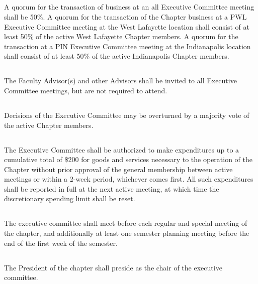 \documentclass[10pt, oneside]{article}
\begin{document}
\subsection{}
A quorum for the transaction of business at an all Executive Committee meeting shall be 50\%. A quorum for the transaction of the Chapter business at a PWL Executive Committee meeting at the West Lafayette location shall consist of at least 50\% of the active West Lafayette Chapter members. A quorum for the transaction at a PIN Executive Committee meeting at the Indianapolis location shall consist of at least 50\% of the active Indianapolis Chapter members. 

\subsection{}
The Faculty Advisor(s) and other Advisors shall be invited to all Executive Committee meetings, but are not required to attend.

\subsection{}
Decisions of the Executive Committee may be overturned by a majority vote of the active Chapter members.

\subsection{}
The Executive Committee shall be authorized to make expenditures up to a cumulative total of \$200 for goods and services necessary to the operation of the Chapter without prior approval of the general membership between active meetings or within a 2-week period, whichever comes first. All such expenditures shall be reported in full at the next active meeting, at which time the discretionary spending limit shall be reset.

\subsection{}
The executive committee shall meet before each regular and special meeting of the chapter, and additionally at least one semester planning meeting before the end of the first week of the semester.

\subsection{}
The President of the chapter shall preside as the chair of the executive committee.
\end{document}
